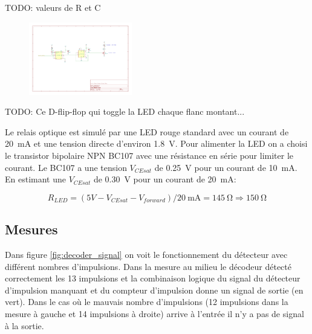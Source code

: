 \documentclass[french]{layout/Report}
\begin{document}
\begin{description}[leftmargin=!,labelwidth=4cm, labelindent=\parindent]
	\item[Détecteur d'interruption] TODO: valeurs de R et C

    \begin{figure}[H]
    \centering
    \includegraphics[width=0.4\textwidth]{fig/interrupt_detect.pdf}
    \end{figure}

    \item[Commutateur] TODO: Ce D-flip-flop qui toggle la LED chaque flanc montant...


	\item[Relais] Le relais optique est simulé par une LED rouge standard avec un courant de \SI{20}{\milli\ampere} et une tension directe d'environ \SI{1.8}{\volt}. Pour alimenter la LED on a choisi le transistor bipolaire NPN BC107 avec une résistance en série pour limiter le courant.
		Le BC107 a une tension \(V_{CEsat}\) de \SI{0.25}{\volt} pour un courant de \SI{10}{\milli\ampere}.
		En estimant une \(V_{CEsat}\) de \SI{0.30}{\volt} pour un courant de \SI{20}{\milli\ampere}:

    \begin{equation*}
    R_{LED} = (5V - V_{CEsat} - V_{forward})/\SI{20}{\milli\ampere} = \SI{145}{\ohm} \Rightarrow \SI{150}{\ohm}
    \end{equation*}


\end{description}
\subsection{Mesures}

Dans figure \ref{fig:decoder_signal} on voit le fonctionnement du détecteur avec différent nombres d'impulsions.
Dans la mesure au milieu le décodeur détecté correctement les 13 impulsions et la combinaison logique
du signal du détecteur d'impulsion manquant et du compteur d'impulsion donne un signal de sortie (en vert).
Dans le cas où le mauvais nombre  d'impulsions (12 impulsions dans la mesure à gauche et 14 impulsions à droite)
arrive à l'entrée il n'y a pas de signal à la sortie.
\end{document}
